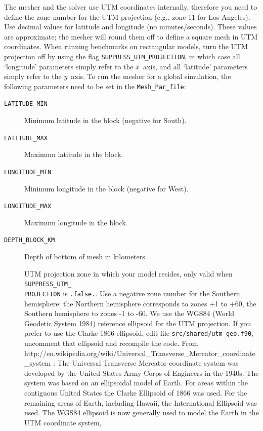 The mesher and the solver use UTM coordinates internally, therefore
you need to define the zone number for the UTM projection (e.g., zone
11 for Los Angeles). Use decimal values for latitude and longitude
(no minutes/seconds). These values are approximate; the mesher will
round them off to define a square mesh in UTM coordinates. When running
benchmarks on rectangular models, turn the UTM projection off by using
the flag \texttt{\small SUPPRESS\_UTM\_PROJECTION}{\small , in which
case all `longitude' parameters simply refer to the $x$~axis, and
all `latitude' parameters simply refer to the $y$~axis. To run the
mesher for a global simulation, the following parameters need to be
set in the }\texttt{\small Mesh\_Par\_file}{\small :}{\small \par}
\begin{description}
\item [{\texttt{LATITUDE\_MIN}}] Minimum latitude in the block (negative
for South).
\item [{\texttt{LATITUDE\_MAX}}] Maximum latitude in the block.
\item [{\texttt{LONGITUDE\_MIN}}] Minimum longitude in the block (negative
for West).
\item [{\texttt{LONGITUDE\_MAX}}] Maximum longitude in the block.
\item [{\texttt{DEPTH\_BLOCK\_KM}}] Depth of bottom of mesh in kilometers.
\item [{\texttt{}}] UTM projection zone in
which your model resides, only valid when \texttt{SUPPRESS\_UTM\_}~\\
 \texttt{PROJECTION} is \texttt{.false.}.
Use a negative zone number for the Southern hemisphere:
the Northern hemisphere corresponds to zones +1 to +60,
the Southern hemisphere to zones -1 to -60.
We use the WGS84 (World Geodetic System 1984) reference ellipsoid for the UTM projection. If you prefer to use the Clarke 1866 ellipsoid,
edit file \texttt{src/shared/utm\_geo.f90}, uncomment that ellipsoid and recompile the code.
From http://en.wikipedia.org/wiki/Universal\_Transverse\_Mercator\_coordinate\_system :
The Universal Transverse Mercator coordinate system was developed by the United States Army Corps of Engineers in the 1940s.
The system was based on an ellipsoidal model of Earth. For areas within the contiguous United States
the Clarke Ellipsoid of 1866 was used. For the remaining areas of Earth, including Hawaii, the International Ellipsoid was used.
The WGS84 ellipsoid is now generally used to model the Earth in the UTM coordinate system,

\end{description}
